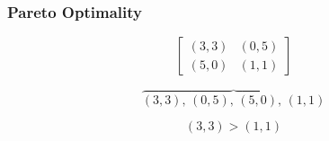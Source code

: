 \begin{frame}
    \frametitle{Pareto Optimality}
    
    \centering
    \begin{equation*}
        \begin{bmatrix}
            (3,3) & (0,5) \\
            (5,0) & (1,1)
        \end{bmatrix}
    \end{equation*}

    \vspace{-0.5cm}
    \begin{equation*}
        \overbrace{(3,3), \, (0,5), \, (5,0), \, (1,1)}
    \end{equation*}

    \begin{equation*}
        (3,3) > (1,1)
    \end{equation*}
\end{frame}
